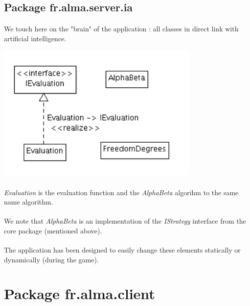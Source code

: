 \documentclass[a4paper,12pt]{report}
\begin{document}
      \subsection{Package fr.alma.server.ia}
	  \paragraph*{}
	      We touch here on the "brain" of the application : all classes in direct link with artificial intelligence.
	      \begin{center}
		\includegraphics[width=0.75\textwidth]{img_rapport/designing_5.png}
	      \end{center}
	  \paragraph*{}
		\textit{Evaluation} is the evaluation function and the \textit{AlphaBeta} algorihm to the same name algorithm.

	  \paragraph*{}
	      We note that \textit{AlphaBeta} is an implementation of the \textit{IStrategy} interface from the core package (mentioned above).

	  \paragraph*{}
	      The application has been designed to easily change these elements statically or dynamically (during the game).

    \section{Package fr.alma.client}
\end{document}
